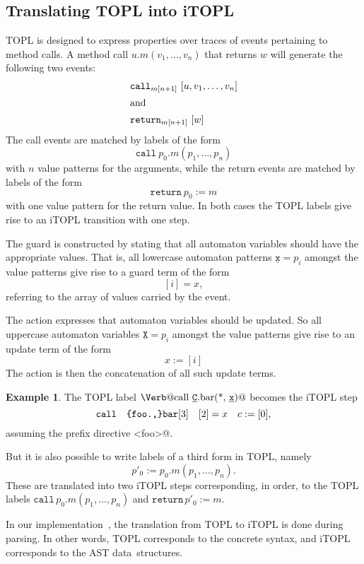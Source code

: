 \documentclass{sigplanconf} %
\newcommand{\pattern}[1]{\ensuremath{\mathtt{\underline{#1}}}}
\theoremstyle{definition}
\newtheorem{example}{Example}
\theoremstyle{remark}
\begin{document}
\subsection{Translating TOPL into iTOPL}\label{sec:syntax.desugaring} %


TOPL is designed to express properties over traces of events
pertaining to method calls.
A method call $u.m(v_1, \ldots, v_n)$ that returns $w$ will generate the following two events:
\begin{align*}
  &\mathtt{call}_{m[n+1]}\ [u, v_1, \ldots, v_n]\\
  \intertext{and}
  &\mathtt{return}_{m[n+1]}\ [w]
\end{align*}
The call events are matched by labels of the form
\[
  \mathtt{call}\ p_0.m(p_1, \ldots, p_n)
\]
with $n$ value patterns for the arguments,
while the return events are matched by labels of the form
\[
  \mathtt{return}\ p_0:=m
\]
with one value pattern for the return value.
In both cases the TOPL labels give rise to an iTOPL transition with one step.

The guard is constructed by stating that all automaton variables
should have the appropriate values. That is, all lowercase automaton
patterns $\pattern{x} = p_i$ amongst the value
patterns give rise to a guard term of the form
\[
[i] = x,
\]
referring to the array of values carried by the event.

The action expresses that automaton variables should be updated. So
all uppercase automaton variables $\pattern{X} = p_i$ amongst the value
patterns give rise to an update term of the form
\[
x := [i]
\]
The action is then the concatenation of all such update terms.

\begin{example}
The TOPL label
$\text{\Verb@call \pattern{C}.bar(*, \pattern{x})@}$
becomes the iTOPL step
\[ \mathtt{call}\quad \verb@{foo.,}bar@ [3]\quad [2]=x\quad c:=[0], \]
assuming the prefix directive \verb@prefix <foo>@.
\end{example}

But it is also possible to write labels of a third form in TOPL,
namely
\[
p'_0 := p_0.m(p_1, \ldots, p_n).
\]
These are translated into two iTOPL steps corresponding, in order, to the TOPL labels $\mathtt{call}\,p_0.m(p_1, \ldots, p_n)$ and $\mathtt{return}\,p'_0:=m$.

In our implementation~\cite{web:topl.prototype}, the translation from TOPL to iTOPL is done during parsing.
In other words, TOPL corresponds to the concrete syntax, and iTOPL corresponds to the AST data~structures.
\end{document}
